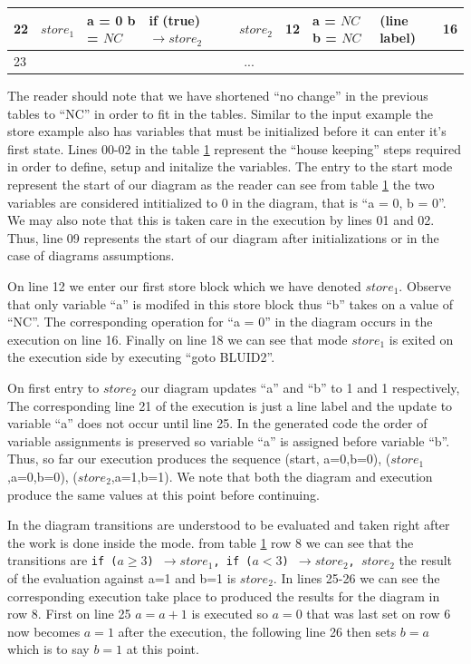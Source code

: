 \begin{table}[htcb]
\begin{tabular}{|p{} | p{} | p{} | p{} | p{} | p{} | p{} | p{} | p{} |}
			\hline
			22&$store_1$			&	a = 0 \newline b = $NC$		&	if (true) $\rightarrow store_2$ & $store_2$			&	12					&	a = $NC$ \newline b = $NC$	&	(line label)				&	16	\\
			\hline
			23&\multicolumn{8}{|c|}{...}\\
			\hline
		\end{tabular}
	\label{table:StoreExecCombined}
\end{table}

The reader should note that we have shortened ``no change'' in the previous tables to ``NC'' in order to fit
in the tables.  Similar to the input example the store example also has variables that must be initialized 
before it can enter it's first state. Lines 00-02 in the table \ref{table:StoreExecCombined} represent the 
``house keeping'' steps required in order to define, setup and initalize the variables. The entry to the start
mode represent the start of our diagram as the reader can see from table \ref{table:StoreExecCombined} the two
variables are considered intitialized to 0 in the diagram, that is ``a = 0, b = 0''. We may also note that this
is taken care in the execution by lines 01 and 02. Thus, line 09 represents the start of our diagram after 
initializations or in the case of diagrams assumptions.

On line 12 we enter our first store block which we
have denoted $store_1$. Observe that only variable ``a'' is modifed in this store block thus ``b'' takes on 
a value of ``NC''. The corresponding operation for ``a = 0'' in the diagram occurs in the execution on line 16.
Finally on line 18 we can see that mode $store_1$ is exited on the execution side by executing ``goto BLUID2''.

On first entry to $store_2$ our diagram updates ``a'' and ``b'' to 1 and 1 respectively, The corresponding line 21 of
the execution is just a line label and the update to variable ``a'' does not occur until line 25. In the generated
code the order of variable assignments is preserved so variable ``a'' is assigned before variable ``b''. Thus, so
far our execution produces the sequence (start, {a=0,b=0}), ($store_1$,{a=0,b=0}), ($store_2$,{a=1,b=1}). We note that
both the diagram and execution produce the same values at this point before continuing.

In the diagram transitions are understood to be evaluated and taken right after the work is done inside the mode.
from table \ref{table:StoreExecCombined} row 8 we can see that the transitions are 
\texttt{if ($a \geq 3$) $\rightarrow store_1$, if ($a < 3$) $\rightarrow store_2$, $store_2$} the result of the
evaluation against a=1 and b=1 is $store_2$. In lines 25-26 we can see the corresponding execution take place to
produced the results for the diagram in row 8. First on line 25 $a = a + 1$ is executed so $a = 0$ that was last set
on row 6 now becomes $a = 1$ after the execution, the following line 26 then sets $b = a$ which is to say $b = 1$ at
this point.

